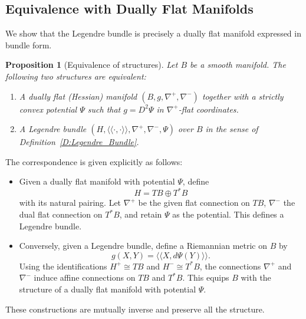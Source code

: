 \documentclass[12pt]{amsart}
\newtheorem{prop}{Proposition}
\begin{document}
\subsection{Equivalence with Dually Flat Manifolds}
We show that the Legendre bundle is precisely a dually flat manifold expressed in bundle form. 
\begin{prop}[Equivalence of structures]\label{P:2.4}
Let $B$ be a smooth manifold. The following two structures are equivalent:

\begin{enumerate}
\item A \emph{dually flat (Hessian) manifold} $(B, g, \nabla^+, \nabla^-)$ together with a strictly convex potential $\Psi$ such that $g = D^2 \Psi$ in $\nabla^+$-flat coordinates.

\item A \emph{Legendre bundle} $(H, \langle\!\langle \cdot, \cdot \rangle\!\rangle, \nabla^+, \nabla^-, \Psi)$ over $B$ in the sense of Definition~\ref{D:Legendre_Bundle}.
\end{enumerate}
\end{prop}

The correspondence is given explicitly as follows:

\begin{itemize}
\item Given a dually flat manifold with potential $\Psi$, define
\[
H = TB \oplus T^*B
\]
with its natural pairing. Let $\nabla^+$ be the given flat connection on $TB$, $\nabla^-$ the dual flat connection on $T^*B$, and retain $\Psi$ as the potential. This defines a Legendre bundle.

\item Conversely, given a Legendre bundle, define a Riemannian metric on $B$ by
\[
g(X,Y) = \langle\!\langle X, d\Psi(Y) \rangle\!\rangle.
\]
Using the identifications $H^+ \cong TB$ and $H^- \cong T^*B$, the connections $\nabla^+$ and $\nabla^-$ induce affine connections on $TB$ and $T^*B$. This equips $B$ with the structure of a dually flat manifold with potential $\Psi$.
\end{itemize}

These constructions are mutually inverse and preserve all the structure.
\end{document}

